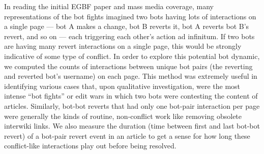 \documentclass[format=acmsmall, review=false, screen=true]{acmart}%
\begin{document}
In reading the initial EGBF paper and mass media coverage, many representations of the bot fights imagined two bots having lots of interactions on a single page --- bot A makes a change, bot B reverts it, bot A reverts bot B's revert, and so on --- each triggering each other's action ad infinitum. If two bots are having many revert interactions on a single page, this would be strongly indicative of some type of conflict. In order to explore this potential bot dynamic, we computed the counts of interactions between unique bot pairs (the reverting and reverted bot's username) on each page. This method was extremely useful in identifying various cases that, upon qualitative investigation, were the most intense ``bot fights'' or edit wars in which two bots were contesting the content of articles. Similarly, bot-bot reverts that had only one bot-pair interaction per page were generally the kinds of routine, non-conflict work like removing obsolete interwiki links. We also measure the duration (time between first and last bot-bot revert) of a bot-pair revert event in an article to get a sense for how long these conflict-like interactions play out before being resolved.  
\end{document}
